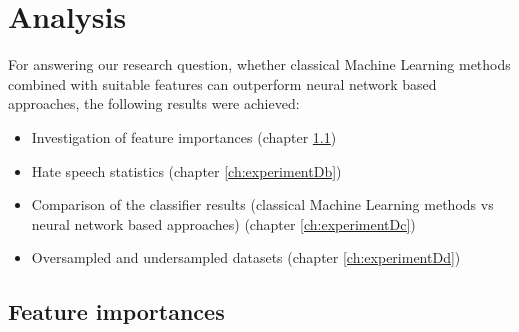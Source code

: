 \section{Analysis} \label{analysis}

For answering our research question, whether classical Machine Learning methods combined with suitable features can outperform neural network based approaches, the following results were achieved:
\begin{itemize}
	\item Investigation of feature importances (chapter \ref{ch:experimentDa})
	\item Hate speech statistics (chapter \ref{ch:experimentDb})
	\item Comparison of the classifier results (classical Machine Learning methods vs neural network based approaches) (chapter \ref{ch:experimentDc})
	\item Oversampled and undersampled datasets (chapter \ref{ch:experimentDd})
\end{itemize}

\subsection{Feature importances}
\label{ch:experimentDa}

